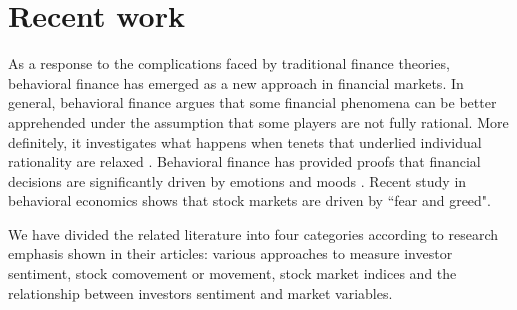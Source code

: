 \documentclass[review,3p,times,12pt,number]{elsarticle}
\begin{document}
\section{Recent work}
\label{sec:weibo:lr}
As a response to the complications faced by traditional finance theories, behavioral finance has emerged as a new approach in financial markets. In general, behavioral finance argues that some financial phenomena can be better apprehended under the assumption that some players are not fully rational. More definitely, it investigates what happens when tenets that underlied individual rationality are relaxed \cite{Barberis2002}. Behavioral finance has provided proofs that financial decisions are significantly driven by emotions and moods \cite{Nofsinger2005}. Recent study in behavioral economics \cite{lo2004adaptive} shows that stock markets are driven by ``fear and greed". %
\indent

We have divided the related literature into four categories according to research emphasis shown in their articles: various approaches to measure investor sentiment, stock comovement or movement, stock market indices and the relationship between investors sentiment and market variables.
\end{document}

